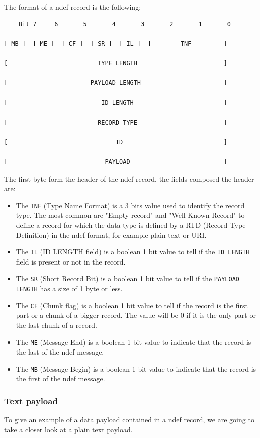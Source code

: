 \documentclass[twoside, openright,11pt,a4paper]{book}
\begin{document}
The format of a \gls{ndef} record is the following\cite{nfc:ndef:adafruit:article}:
\begin{verbatim}
	Bit 7     6       5       4       3       2       1       0
------  ------  ------  ------  ------  ------  ------  ------ 
[ MB ]  [ ME ]  [ CF ]  [ SR ]  [ IL ]  [        TNF         ]  

[                         TYPE LENGTH                        ]

[                       PAYLOAD LENGTH                       ]

[                          ID LENGTH                         ]

[                         RECORD TYPE                        ]

[                              ID                            ]

[                           PAYLOAD                          ]
\end{verbatim}
The first byte form the header of the \gls{ndef} record, the fields composed the header are:
\begin{itemize}
	\item The \verb+TNF+ (Type Name Format) is a 3 bits value used to identify the record type. The most common are "Empty record" and "Well-Known-Record" to define a record for which the data type is defined by a RTD (Record Type Definition) in the \gls{ndef} format, for example plain text or URI.
	\item The \verb+IL+ (ID LENGTH field) is a boolean 1 bit value to tell if the \verb+ID LENGTH+ field is present or not in the record.
	\item The \verb+SR+ (Short Record Bit) is a boolean 1 bit value to tell if the \verb+PAYLOAD LENGTH+ has a size of 1 byte or less.
	\item The \verb+CF+ (Chunk flag) is a boolean 1 bit value to tell if the record is the first part or a chunk of a bigger record. The value will be 0 if it is the only part or the last chunk of a record.
	\item The \verb+ME+ (Message End) is a boolean 1 bit value to indicate that the record is the last of the \gls{ndef} message.
	\item The \verb+MB+ (Message Begin) is a boolean 1 bit value to indicate that the record is the first of the \gls{ndef} message.
\end{itemize}
\subsubsection{Text payload}
To give an example of a data payload contained in a \gls{ndef} record, we are going to take a closer look at a plain text payload.
\end{document}
